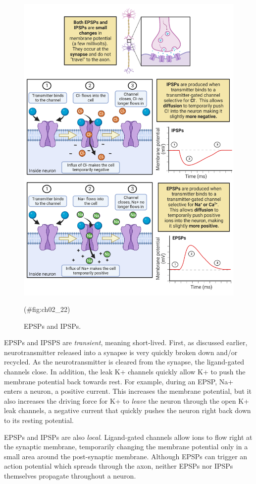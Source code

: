 \documentclass[
]{book}
\begin{document}
\begin{figure}

{\centering \includegraphics[width=0.8\linewidth]{images/ch02/02_22} 

}

\caption{EPSPs and IPSPs.}(\#fig:ch02_22)
\end{figure}

EPSPs and IPSPS are \emph{transient}, meaning short-lived. First, as discussed earlier, neurotransmitter released into a synapse is very quickly broken down and/or recycled. As the neurotransmitter is cleared from the synapse, the ligand-gated channels close. In addition, the leak K+ channels quickly allow K+ to push the membrane potential back towards rest. For example, during an EPSP, Na+ enters a neuron, a positive current. This increases the membrane potential, but it also increases the driving force for K+ to \emph{leave} the neuron through the open K+ leak channels, a negative current that quickly pushes the neuron right back down to its resting potential.

EPSPs and IPSPs are also \emph{local}. Ligand-gated channels allow ions to flow right at the synaptic membrane, temporarily changing the membrane potential only in a small area around the post-synaptic membrane. Although EPSPs can trigger an action potential which spreads through the axon, neither EPSPs nor IPSPs themselves propagate throughout a neuron.
\end{document}
